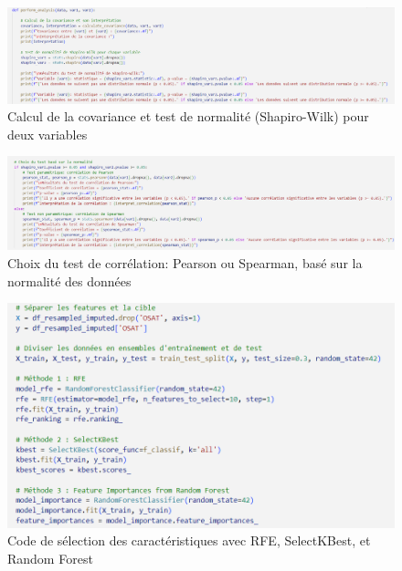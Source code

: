 \begin{figure}[H]
    \centering
    \includegraphics[width=0.8\linewidth]{capture_sas_28.png}
    \caption{Calcul de la covariance et test de normalité (Shapiro-Wilk) pour deux variables}
    \label{molka}
\end{figure}
\vspace{10pt}

\begin{figure}[H]
    \centering
    \includegraphics[width=0.8\linewidth]{capture_sas_29.png}
    \caption{Choix du test de corrélation: Pearson ou Spearman, basé sur la normalité des données}
    \label{hamma}
\end{figure}
\vspace{10pt}

\begin{figure}[H]
    \centering
    \includegraphics[width=0.9\linewidth]{capture_sas_61.png}
    \caption{Code de sélection des caractéristiques avec RFE, SelectKBest, et Random Forest}
    \label{code_features_Selection}
\end{figure}
\vspace{10pt}

